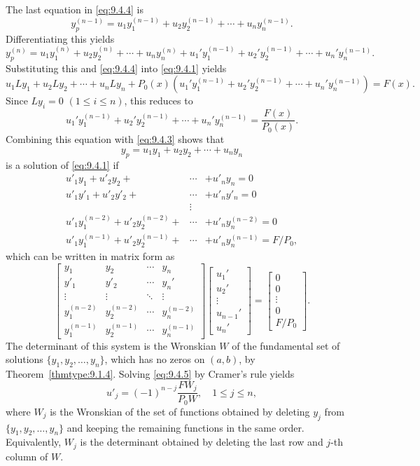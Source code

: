 \documentclass{ximera}
\begin{document}
The last equation in \eqref{eq:9.4.4} is
$$
y_p^{(n-1)}=u_1y_1^{(n-1)}+u_2y_2^{(n-1)}+\cdots+u_ny_n^{(n-1)}.
$$
Differentiating this yields
$$
y_p^{(n)}=u_1y_1^{(n)}+u_2y_2^{(n)}+\cdots+u_ny_n^{(n)}+
u_1'y_1^{(n-1)}+u_2'y_2^{(n-1)}+\cdots+u_n'y_n^{(n-1)}.
$$
Substituting this and  \eqref{eq:9.4.4} into \eqref{eq:9.4.1}
yields
$$
u_1Ly_1+u_2Ly_2+\cdots+u_nLy_n+P_0(x)\left(
u_1'y_1^{(n-1)}+u_2'y_2^{(n-1)}+\cdots+u_n'y_n^{(n-1)}\right)=F(x).
$$
Since  $Ly_i=0$ $(1 \leq i \leq n)$, this reduces to
$$
u_1'y_1^{(n-1)}+u_2'y_2^{(n-1)}+\cdots+u_n'y_n^{(n-1)}=\frac{F(x)}{P_0(x)}.
$$
Combining this equation with \eqref{eq:9.4.3} shows that
$$
y_p=u_1y_1+u_2y_2+\cdots+u_ny_n
$$
is a solution of \eqref{eq:9.4.1} if
$$
\begin{array}{rcl}
u'_1y_1+u'_2y_2+&\cdots&+u'_ny_n=0 \\
u'_1y'_1+u'_2y'_2+&\cdots&+u'_ny'_n=0 \\
&\vdots& \\
u'_1y_1^{(n-2)}+u'_2y^{(n-2)}_2+&\cdots&+u'_ny^{(n-2)}_n
=0 \\
u'_1y^{(n-1)}_1+u'_2y^{(n-1)}_2+&\cdots&+u'_n
y^{(n-1)}_n=F/P_0,
\end{array}
$$
which can be written in matrix form as
\begin{equation} \label{eq:9.4.5}
\begin{bmatrix}
y_1&y_2&\cdots&y_n \\
y'_1&y'_2&\cdots&y_n'\\
\vdots&\vdots&\ddots&\vdots\\
y_1^{(n-2)}&y_2^{(n-2)}&\cdots&y_n^{(n-2)}\\
y_1^{(n-1)}&y_2^{(n-1)}&\cdots&y_n^{(n-1)}
\end{bmatrix}
\begin{bmatrix}u_1'\\u_2'\\\vdots\\u_{n-1}'\\u_n'\end{bmatrix}=
\begin{bmatrix}0\\0\\ \vdots\\0\\F/ P_0\end{bmatrix}.
\end{equation}
The determinant of this system  is the Wronskian $W$ of
the fundamental set of solutions  $\{y_1,y_2,\dots,y_n\}$,
which has no zeros on $(a,b)$, by Theorem~\ref{thmtype:9.1.4}.
Solving
\eqref{eq:9.4.5} by Cramer's rule  yields
\begin{equation} \label{eq:9.4.6}
u'_j=(-1)^{n-j}\frac{FW_j}{P_0W},\quad 1\leq j\leq n,
\end{equation}
 where $W_j$ is the Wronskian of the set of
functions obtained by deleting $y_j$ from  $\{y_1,y_2,\dots,y_n\}$
 and keeping the remaining functions in the
same order. Equivalently, $W_j$ is the determinant obtained by
deleting the last row and $j$-th column of $W$.
\end{document}
